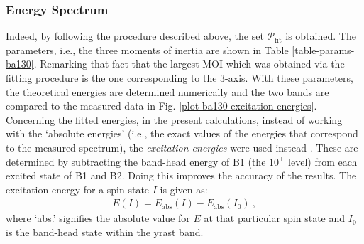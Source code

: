 \subsubsection{Energy Spectrum}

Indeed, by following the procedure described above, the set $\mathcal{P}_\text{fit}$ is obtained. The parameters, i.e., the three moments of inertia are shown in Table \ref{table-params-ba130}. Remarking that fact that the largest MOI which was obtained via the fitting procedure is the one corresponding to the $3$-axis. With these parameters, the theoretical energies are determined numerically and the two bands are compared to the measured data in Fig. \ref{plot-ba130-excitation-energies}. Concerning the fitted energies, in the present calculations, instead of working with the `absolute energies' (i.e., the exact values of the energies that correspond to the measured spectrum), the \emph{excitation energies} were used instead \cite{raduta2017semiclassical,raduta2018wobbling,raduta2020towards}. These are determined by subtracting the band-head energy of B1 (the $10^+$ level) from each excited state of B1 and B2. Doing this improves the accuracy of the results. The excitation energy for a spin state $I$ is given as:
\begin{align}
    E(I)=E_\text{abs}(I)-E_\text{abs}(I_0)\ ,
    \label{excitation-energy-general-formula}
\end{align}
where `abs.' signifies the absolute value for $E$ at that particular spin state and $I_0$ is the band-head state within the yrast band.

\begin{table}
    \centering
    \caption{The parameter set $\mathcal{P}_\text{fit}$ obtained from the fitting procedure of the excitation energies of the two wobbling bands (B1 and B2) for $^{130}$Ba. The model function corresponds to the energy of a simple wobbler (see Eq. \ref{eq-wobbling-energy-evenA}).}
    \label{table-params-ba130}
\end{table}

